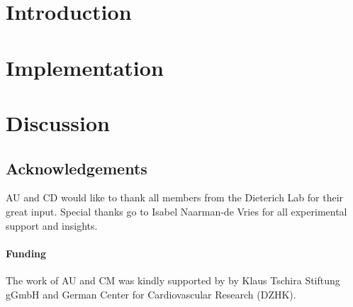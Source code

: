 \documentclass{bioinfo}
\begin{document}
\section*{Introduction}

\section*{Implementation}

\section*{Discussion}

\subsection*{Acknowledgements}
AU and CD would like to thank all members from the Dieterich Lab for their great input.
Special thanks go to Isabel Naarman-de Vries for all experimental support and insights.
\paragraph{Funding\textcolon} 
The work of AU and CM was kindly supported by
by Klaus Tschira Stiftung gGmbH and German Center for Cardiovascular Research (DZHK).

%
%
%
%
%
%
%

\end{document}
